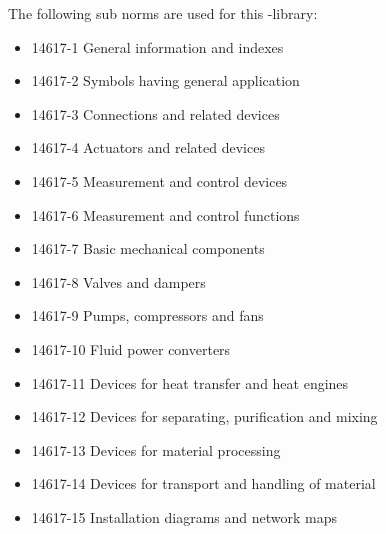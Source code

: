 \documentclass[a4paper]{ltxdoc}
\begin{document}
\bigskip
\noindent The following sub norms are used for this \tikzname-library:
\begin{itemize}
 \setlength\itemsep{0pt}
 \item 14617-1 General information and indexes
 \item 14617-2 Symbols having general application
 \item 14617-3 Connections and related devices
 \item 14617-4 Actuators and related devices
 \item 14617-5 Measurement and control devices
 \item 14617-6 Measurement and control functions
 \item 14617-7 Basic mechanical components
 \item 14617-8 Valves and dampers
 \item 14617-9 Pumps, compressors and fans
 \item 14617-10 Fluid power converters
 \item 14617-11 Devices for heat transfer and heat engines
 \item 14617-12 Devices for separating, purification and mixing
 \item 14617-13 Devices for material processing
 \item 14617-14 Devices for transport and handling of material
 \item 14617-15 Installation diagrams and network maps
\end{itemize}
\end{document}
